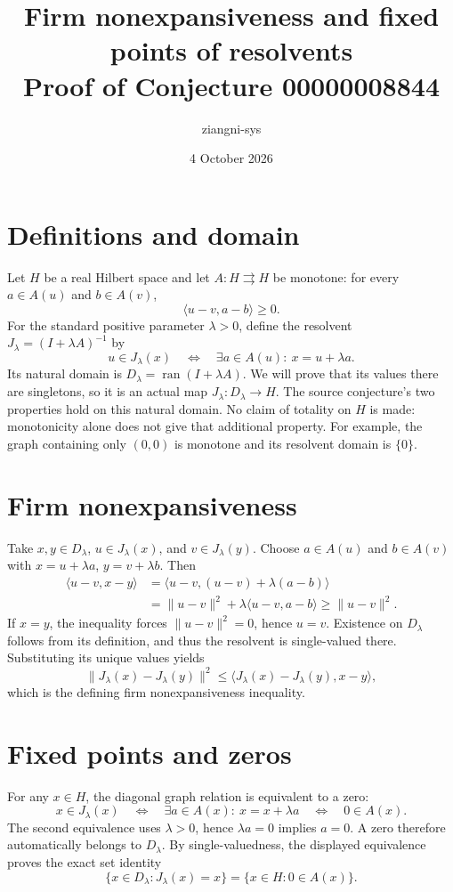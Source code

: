\documentclass[10pt,a4paper]{article}
\title{Firm nonexpansiveness and fixed points of resolvents\\
\large Proof of Conjecture 00000008844}
\author{ziangni-sys}
\date{4 October 2026}
\begin{document}
\maketitle

\section*{Definitions and domain}
Let $H$ be a real Hilbert space and let $A:H\rightrightarrows H$ be
monotone: for every $a\in A(u)$ and $b\in A(v)$,
\[
\langle u-v,a-b\rangle\geq0.
\]
For the standard positive parameter $\lambda>0$, define the resolvent
$J_\lambda=(I+\lambda A)^{-1}$ by
\[
u\in J_\lambda(x)
\quad\Longleftrightarrow\quad
\exists a\in A(u):\ x=u+\lambda a.
\]
Its natural domain is $D_\lambda=\operatorname{ran}(I+\lambda A)$.
We will prove that its values there are singletons, so it is an actual
map $J_\lambda:D_\lambda\to H$.
The source conjecture's two properties hold on this natural domain.
No claim of totality on $H$ is made: monotonicity alone does not give
that additional property. For example, the graph containing only $(0,0)$
is monotone and its resolvent domain is $\{0\}$.

\section*{Firm nonexpansiveness}
Take $x,y\in D_\lambda$, $u\in J_\lambda(x)$, and $v\in J_\lambda(y)$.
Choose $a\in A(u)$ and $b\in A(v)$ with
$x=u+\lambda a$, $y=v+\lambda b$. Then
\begin{align*}
\langle u-v,x-y\rangle
&=\langle u-v,(u-v)+\lambda(a-b)\rangle\\
&=\|u-v\|^2+\lambda\langle u-v,a-b\rangle
\geq\|u-v\|^2.
\end{align*}
If $x=y$, the inequality forces $\|u-v\|^2=0$, hence $u=v$.
Existence on $D_\lambda$ follows from its definition, and thus the
resolvent is single-valued there. Substituting its unique values yields
\[
\|J_\lambda(x)-J_\lambda(y)\|^2
\leq\langle J_\lambda(x)-J_\lambda(y),x-y\rangle,
\]
which is the defining firm nonexpansiveness inequality.

\section*{Fixed points and zeros}
For any $x\in H$, the diagonal graph relation is equivalent to a zero:
\[
x\in J_\lambda(x)
\quad\Longleftrightarrow\quad
\exists a\in A(x):\ x=x+\lambda a
\quad\Longleftrightarrow\quad
0\in A(x).
\]
The second equivalence uses $\lambda>0$, hence $\lambda a=0$ implies $a=0$.
A zero therefore automatically belongs to $D_\lambda$. By single-valuedness,
the displayed equivalence proves the exact set identity
\[
\{x\in D_\lambda:J_\lambda(x)=x\}
=\{x\in H:0\in A(x)\}.
\]
\end{document}
